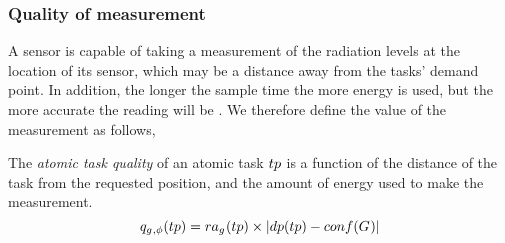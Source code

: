 \newcommand{\functionAtomicTaskQualitySignature}[2]{
	\functionSignature{q_{\varAgent{}{}, \varTime{}{}}} {\varAtomicTask{}{}}
}
\newcommand{\functionCompositeTaskValue}[2]{
	\functionSignature{ctv}{\varCompositeTask{}{}}
}
\subsubsection*{Quality of measurement}

A sensor is capable of taking a measurement of the radiation levels at the location of its sensor, which may be a distance away from the tasks' demand point. In addition, the longer the sample time the more energy is used, but the more accurate the reading will be \cite{dummy}. We therefore define the value of the measurement as follows,
\begin{definition}
	The \textit{atomic task quality} of an atomic task $\varAtomicTask{}{}$ is a function of the distance of the task from the requested position, and the amount of energy used to make the measurement.
	\begin{equation}
		\functionAtomicTaskQualitySignature{}{} = \functionTaskResourceAllocation{}{} \times \funcSize{
				\functionTaskDemandPoint{}{} - \functionDeployment{}{}
		}{}
	\end{equation}
\end{definition}

